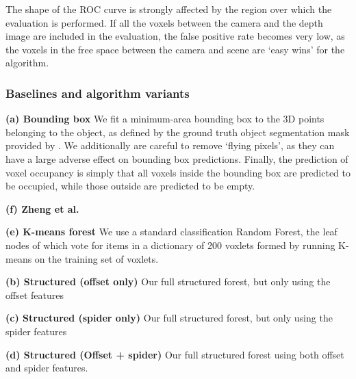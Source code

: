 \documentclass[10pt,twocolumn,letterpaper]{article}
\makeatletter
\newcommand*{\ea}{et al.\@\xspace}
\makeatother
\begin{document}
The shape of the ROC curve is strongly affected by the region over which the evaluation is performed.
If all the voxels between the camera and the depth image are included in the evaluation, the false positive rate becomes very low, as the voxels in the free space between the camera and scene are `easy wins' for the algorithm. 


\subsubsection{Baselines and algorithm variants}
\label{sec:algorithms}

\noindent \textbf{(a) Bounding box} We fit a minimum-area bounding box to the 3D points belonging to the object, as defined by the ground truth object segmentation mask provided by \cite{singh-icra-2014}.
We additionally are careful to remove `flying pixels', as they can have a large adverse effect on bounding box predictions.
Finally, the prediction of voxel occupancy is simply that all voxels inside the bounding box are predicted to be occupied, while those outside are predicted to be empty.

\noindent \textbf{(f) Zheng \ea \cite{zheng-cvpr-2013}}

\noindent \textbf{(e) K-means forest} We use a standard classification Random Forest, the leaf nodes of which vote for items in a dictionary of 200 voxlets formed by running K-means on the training set of voxlets.

\noindent \textbf{(b) Structured (offset only)} Our full structured forest, but only using the offset features

\noindent \textbf{(c) Structured (spider only)} Our full structured forest, but only using the spider features

\noindent \textbf{(d) Structured (Offset + spider)}  Our full structured forest using both offset and spider features.




\end{document}
